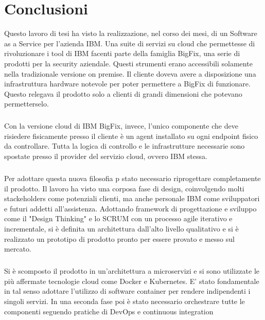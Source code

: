\chapter{Conclusioni}

Questo lavoro di tesi ha visto la realizzazione, nel corso dei mesi, di un Software as a Service per l'azienda IBM. Una suite di servizi su cloud che permettesse di rivoluzionare i tool di IBM facenti parte della famiglia BigFix, una serie di prodotti per la security aziendale. Questi strumenti erano accessibili solamente nella tradizionale versione on premise. Il cliente doveva avere a disposizione una infrastruttura hardware notevole per poter permettere a BigFix di funzionare. Questo relegava il prodotto solo a clienti di grandi dimensioni che potevano permetterselo. 
\paragraph{}
Con la versione cloud di IBM BigFix, invece, l'unico componente che deve risiedere fisicamente presso il cliente è un agent installato su ogni endpoint fisico da controllare. Tutta la logica di controllo e le infrastrutture necessarie sono spostate presso il provider del servizio cloud, ovvero IBM stessa.

\paragraph{}
Per adottare questa nuova filosofia p stato necessario riprogettare completamente il prodotto. Il lavoro ha visto una corposa fase di design, coinvolgendo molti stackeholders come potenziali clienti, ma anche personale IBM come sviluppatori e futuri addetti all'assistenza. Adottando framework di progettazione e sviluppo come il "Design Thinking" e lo SCRUM con un processo agile iterativo e incrementale, si è definita un architettura dall'alto livello qualitativo e si è realizzato un prototipo di prodotto pronto per essere provato e messo sul mercato.
\paragraph{}
Si è scomposto il prodotto in un'architettura a microservizi e si sono utilizzate le più affermate tecnologie cloud come Docker e Kubernetes. E' stato fondamentale in tal senso adottare l'utilizzo di software container per rendere indipendenti i singoli servizi. In una seconda fase poi è stato necessario orchestrare tutte le componenti seguendo pratiche di DevOps e continuous integration

